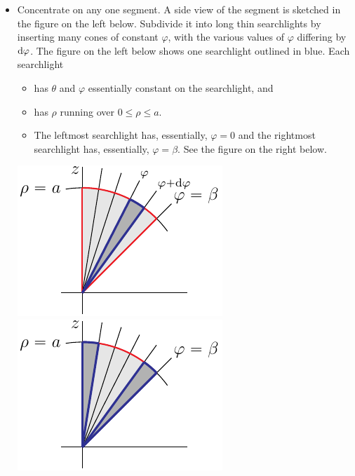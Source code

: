 \begin{eg}
\begin{itemize}
\item 
Concentrate on any one segment. A side view of the segment is sketched
in the figure on the left below. Subdivide it into long thin searchlights
by inserting many cones of constant $\varphi$, with the various values of 
$\varphi$ differing by $\mathrm{d}\varphi$. The figure on the left below shows 
one searchlight outlined in blue. Each searchlight
\vspace{-\topsep}
\begin{itemize} \itemsep1pt \parskip0pt 
\item
has $\theta$  and $\varphi$ essentially constant on the searchlight, and 
\item
has $\rho$ running over $0\le \rho\le a$.
\item The leftmost searchlight has, essentially, $\varphi=0$ and the 
rightmost searchlight has, essentially, $\varphi=\beta$.  See the figure 
on the right below.
\end{itemize}
\vspace{-\topsep}
\begin{efig}
\begin{center}
    \includegraphics{iceCream2.pdf}\qquad
    \includegraphics{iceCream2b.pdf}
\end{center}
\end{efig}


\end{itemize}
\end{eg}
